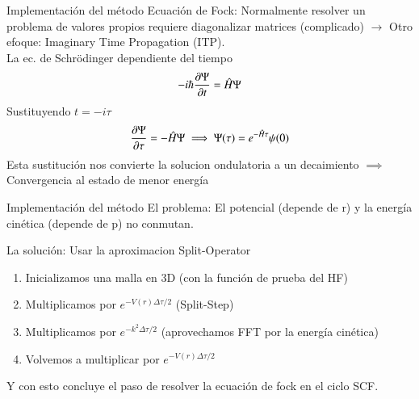 \documentclass{beamer}
\begin{document}
\begin{frame}{Implementación del método}
    Ecuación de Fock: Normalmente resolver un problema de valores propios requiere diagonalizar matrices (complicado) $\to$ Otro efoque: Imaginary Time Propagation (ITP).\\\vspace{4mm}
    La ec. de Schrödinger dependiente del tiempo
    \begin{equation}
        -i\hbar\pdv{\Psi}{t} = \hat{H}\Psi
    \end{equation}
    Sustituyendo $t = -i\tau$
    \begin{equation}
        \pdv{\Psi}{\tau} = -\hat{H}\Psi \implies \Psi(\tau) = e^{-\hat{H}\tau}\psi(0)
    \end{equation}
    Esta sustitución nos convierte la solucion ondulatoria a un decaimiento $\implies$ \alert{Convergencia al estado de menor energía}
\end{frame}

\begin{frame}{Implementación del método}
    El problema: El potencial (depende de r) y la energía cinética (depende de p) no conmutan.\\\vspace{4mm}

    La solución: Usar la aproximacion \alert{Split-Operator}
    \begin{enumerate}[1.-]
        \item Inicializamos una malla en 3D (con la función de prueba del HF)
        \item Multiplicamos por $e^{-V(r)\Delta\tau/2}$ (Split-Step)
        \item Multiplicamos por $e^{-k^2\Delta\tau/2}$ (aprovechamos FFT por la energía cinética)
        \item Volvemos a multiplicar por $e^{-V(r)\Delta\tau/2}$
    \end{enumerate}
    Y con esto concluye el paso de resolver la ecuación de fock en el ciclo SCF.
\end{frame}
\end{document}
